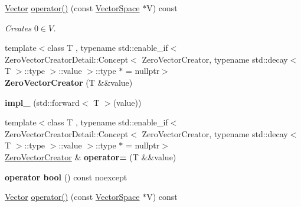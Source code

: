 \begin{DoxyCompactItemize}
\item 
\hypertarget{classSpacy_1_1ZeroVectorCreator_afb20329c56ee527505ef7390eba96870}{\hyperlink{classSpacy_1_1Vector}{\-Vector} \hyperlink{classSpacy_1_1ZeroVectorCreator_afb20329c56ee527505ef7390eba96870}{operator()} (const \hyperlink{classSpacy_1_1VectorSpace}{\-Vector\-Space} $\ast$\-V) const }\label{classSpacy_1_1ZeroVectorCreator_afb20329c56ee527505ef7390eba96870}

\begin{DoxyCompactList}\small\item\em \-Creates $ 0 \in V $. \end{DoxyCompactList}\item 
\hypertarget{classSpacy_1_1ZeroVectorCreator_aa33a8160098d48aa6034497665eaa084}{{\footnotesize template$<$class T , typename std\-::enable\-\_\-if$<$ Zero\-Vector\-Creator\-Detail\-::\-Concept$<$ Zero\-Vector\-Creator, typename std\-::decay$<$ T $>$\-::type $>$\-::value $>$\-::type $\ast$  = nullptr$>$ }\\{\bfseries \-Zero\-Vector\-Creator} (\-T \&\&value)}\label{classSpacy_1_1ZeroVectorCreator_aa33a8160098d48aa6034497665eaa084}

\item 
\hypertarget{classSpacy_1_1ZeroVectorCreator_afd8c08e385def67aaf659572dd256be7}{{\bfseries impl\-\_\-} (std\-::forward$<$ \-T $>$(value))}\label{classSpacy_1_1ZeroVectorCreator_afd8c08e385def67aaf659572dd256be7}

\item 
\hypertarget{classSpacy_1_1ZeroVectorCreator_a6bf1e05757880d3fdd6a1c481237d0a1}{{\footnotesize template$<$class T , typename std\-::enable\-\_\-if$<$ Zero\-Vector\-Creator\-Detail\-::\-Concept$<$ Zero\-Vector\-Creator, typename std\-::decay$<$ T $>$\-::type $>$\-::value $>$\-::type $\ast$  = nullptr$>$ }\\\hyperlink{classSpacy_1_1ZeroVectorCreator}{\-Zero\-Vector\-Creator} \& {\bfseries operator=} (\-T \&\&value)}\label{classSpacy_1_1ZeroVectorCreator_a6bf1e05757880d3fdd6a1c481237d0a1}

\item 
\hypertarget{classSpacy_1_1ZeroVectorCreator_a2a716f5d88147abcdf73e834ec349c06}{{\bfseries operator bool} () const noexcept}\label{classSpacy_1_1ZeroVectorCreator_a2a716f5d88147abcdf73e834ec349c06}

\item 
\hypertarget{classSpacy_1_1ZeroVectorCreator_afb20329c56ee527505ef7390eba96870}{\hyperlink{classSpacy_1_1Vector}{\-Vector} \hyperlink{classSpacy_1_1ZeroVectorCreator_afb20329c56ee527505ef7390eba96870}{operator()} (const \hyperlink{classSpacy_1_1VectorSpace}{\-Vector\-Space} $\ast$\-V) const }\label{classSpacy_1_1ZeroVectorCreator_afb20329c56ee527505ef7390eba96870}


\end{DoxyCompactItemize}
